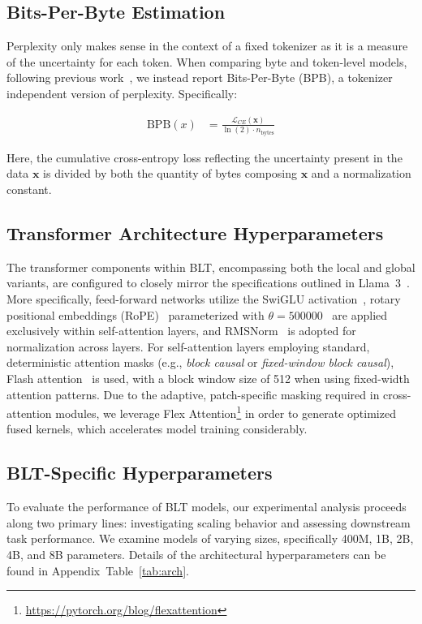 \subsection{Bits-Per-Byte Estimation} Perplexity only makes sense in the context of a fixed tokenizer as it is a measure of the uncertainty for each token. When comparing byte and token-level models, following previous work~\citep{xue2022byt5, yu2023megabyte, wang2024mambabyte}, we instead report Bits-Per-Byte (BPB), a tokenizer independent version of perplexity. Specifically:

\begin{align}
    \text{BPB}(x)&= \frac{\mathcal{L}_{CE}(\pmb{x})}{\ln(2)\cdot n_{\text{bytes}}}
\end{align}

Here, the cumulative cross-entropy loss reflecting the uncertainty present in the data $\pmb{x}$ is divided by both the quantity of bytes composing $\pmb{x}$ and a normalization constant.

\subsection{Transformer Architecture Hyperparameters}  
The transformer components within {\textsc BLT}, encompassing both the local and global variants, are configured to closely mirror the specifications outlined in Llama~3~\citep{dubey2024llama}. More specifically, feed-forward networks utilize the SwiGLU activation~\citep{swiglu}, rotary positional embeddings (RoPE)~\citep{RoPe} parameterized with $\theta=500000$~\citep{xiong2024effective} are applied exclusively within self-attention layers, and RMSNorm~\citep{RMSNorm} is adopted for normalization across layers. For self-attention layers employing standard, deterministic attention masks (e.g., \textit{block causal} or \textit{fixed-window block causal}), Flash attention~\citep{dao2022flashattention} is used, with a block window size of 512 when using fixed-width attention patterns. Due to the adaptive, patch-specific masking required in cross-attention modules, we leverage Flex Attention\footnote{\url{https://pytorch.org/blog/flexattention}} in order to generate optimized fused kernels, which accelerates model training considerably.

\subsection{{\textsc BLT}-Specific Hyperparameters}  
To evaluate the performance of {\textsc BLT} models, our experimental analysis proceeds along two primary lines: investigating scaling behavior and assessing downstream task performance. We examine models of varying sizes, specifically 400M, 1B, 2B, 4B, and 8B parameters. Details of the architectural hyperparameters can be found in Appendix~Table~\ref{tab:arch}.

